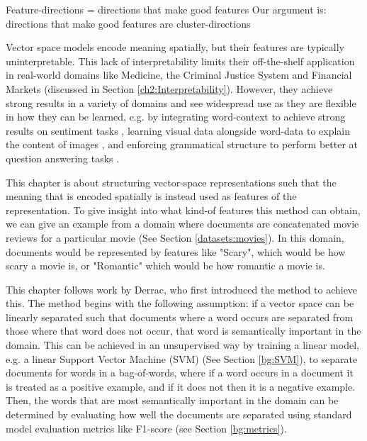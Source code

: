 Feature-directions = directions that make good features
Our argument is: directions that make good features are cluster-directions


Vector space models encode meaning spatially, but their features are typically uninterpretable. This lack of interpretability limits their off-the-shelf application in real-world domains like Medicine, the Criminal Justice System and Financial Markets (discussed in Section \ref{ch2:Interpretability}). However, they achieve strong results in a variety of domains and see widespread use as they  are flexible in how they can be learned, e.g. by integrating word-context  to achieve strong results on sentiment tasks \cite{Pennington2014}, learning visual data alongside word-data to explain the content of images \cite{Mao2014a}, and enforcing grammatical structure to perform better at question answering tasks \cite{Palangi2017}. 

 


This chapter is about structuring vector-space representations such that the meaning that is encoded spatially is instead used as features of the representation. To give insight into what kind-of features this method can obtain, we can give an example from a domain where documents are concatenated movie reviews for a particular movie (See Section \ref{datasets:movies}). In this domain, documents would be represented by features like "Scary", which would be how scary a movie is, or "Romantic" which would be how romantic a movie is.

This chapter follows work by Derrac\cite{Derrac2015}, who first introduced the method to achieve this. The method begins with the following assumption: if a vector space can be linearly separated such that documents where a word occurs are separated from those where that word does not occur, that word is semantically important in the domain. This can be achieved in an unsupervised way by training a linear model, e.g. a linear Support Vector Machine (SVM) (See Section \ref{bg:SVM}), to separate documents for words in a bag-of-words, where if a word occurs in a document it is treated as a positive example, and if it does not then it is a negative example. Then, the words that are most semantically important in the domain can be determined by evaluating how well the documents are separated using standard model evaluation metrics like F1-score (see Section \ref{bg:metrics}).

